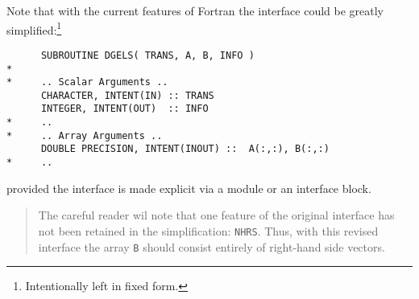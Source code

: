 Note that with the current features of Fortran the interface could be greatly
simplified:\footnote{Intentionally left in fixed form.}
%
\begin{verbatim}
      SUBROUTINE DGELS( TRANS, A, B, INFO )
*
*     .. Scalar Arguments ..
      CHARACTER, INTENT(IN) :: TRANS
      INTEGER, INTENT(OUT)  :: INFO
*     ..
*     .. Array Arguments ..
      DOUBLE PRECISION, INTENT(INOUT) ::  A(:,:), B(:,:)
*     ..
\end{verbatim}
%
\noindent provided the interface is made explicit via a module or an interface block.

\begin{quote}
The careful reader wil note that one feature of the original interface
has not been retained in the simplification: \verb+NHRS+. Thus, with this
revised interface the array \verb+B+ should consist entirely of right-hand
side vectors.
\end{quote}
